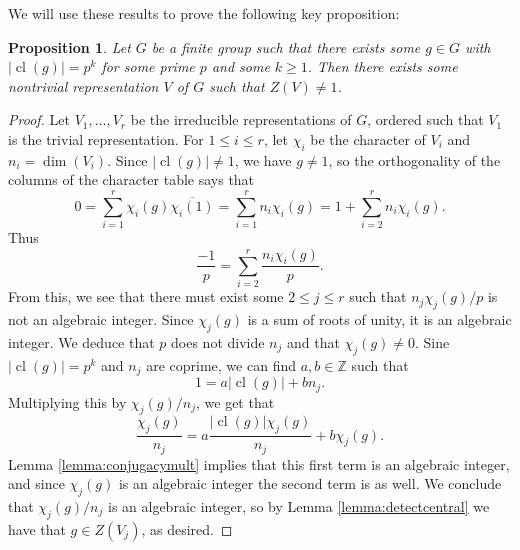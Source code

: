 \documentclass[11pt]{article}
\numberwithin{equation}{section}
\theoremstyle{plain}
\newtheorem{proposition}[theorem]{Proposition}
\theoremstyle{definition}
\newcommand\Z{\ensuremath{\mathbb{Z}}}
\DeclareMathOperator{\cl}{cl}
\begin{document}
We will use these results to prove the following key proposition:

\begin{proposition}
\label{proposition:findcentral}
Let $G$ be a finite group such that there exists some $g \in G$ with $|\cl(g)| = p^k$ for some prime $p$ and
some $k \geq 1$.  Then there exists some nontrivial representation $V$ of $G$ such that $Z(V) \neq 1$.
\end{proposition}
\begin{proof}
Let $V_1,\ldots,V_r$ be the irreducible representations of $G$, ordered such that $V_1$ is the trivial
representation.  For $1 \leq i \leq r$, let $\chi_i$ be the character of $V_i$ and $n_i = \dim(V_i)$.
Since $|\cl(g)| \neq 1$, we have $g \neq 1$, so the orthogonality of the columns of the character table says
that
\[0 = \sum_{i=1}^r \chi_i(g) \overline{\chi_i(1)} = \sum_{i=1}^r n_i \chi_i(g) = 1 + \sum_{i=2}^r n_i \chi_i(g).\]
Thus
\[\frac{-1}{p} = \sum_{i=2}^r \frac{n_i \chi_i(g)}{p}.\]
From this, we see that there must exist some $2 \leq j \leq r$ such that $n_j \chi_j(g)/p$ is not
an algebraic integer.  Since $\chi_j(g)$ is a sum of roots of unity, it is an algebraic integer.  We
deduce that $p$ does not divide $n_j$ and that $\chi_j(g) \neq 0$.  Sine $|\cl(g)| = p^k$ and $n_j$
are coprime, we can find $a,b \in \Z$ such that
\[1 = a |\cl(g)| + b n_j.\]
Multiplying this by $\chi_j(g)/n_j$, we get that
\[\frac{\chi_j(g)}{n_j} = a \frac{|\cl(g)| \chi_j(g)}{n_j} + b \chi_j(g).\]
Lemma \ref{lemma:conjugacymult} implies that this first term is an algebraic integer, and since $\chi_j(g)$
is an algebraic integer the second term is as well.  We conclude that $\chi_j(g)/n_j$ is an algebraic
integer, so by Lemma \ref{lemma:detectcentral} we have that $g \in Z(V_j)$, as desired.
\end{proof}
\end{document}
